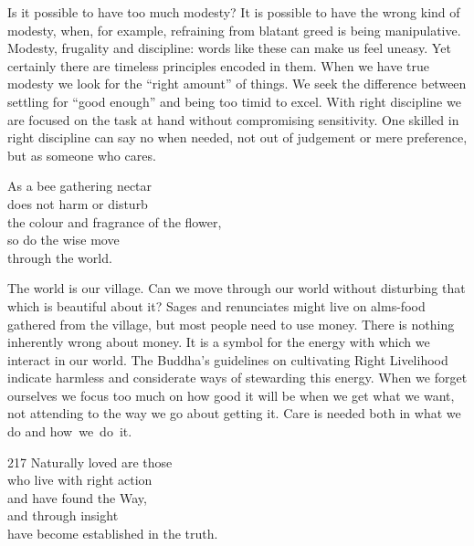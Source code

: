 \begin{dhpRefl}

Is it possible to have too much modesty? It is possible to have the
wrong kind of modesty, when, for example, refraining from blatant
greed is being manipulative. Modesty, frugality and discipline: words
like these can make us feel uneasy. Yet certainly there are timeless
principles encoded in them. When we have true modesty we look for the
``right amount'' of things. We seek the difference between settling for
``good enough'' and being too timid to excel. With right discipline we
are focused on the task at hand without compromising sensitivity.
One skilled in right discipline can say no when needed, not out of
judgement or mere preference, but as someone who cares.

\end{dhpRefl}


\begin{dhpVerse}{49}
\label{dhp-49}
As a bee gathering nectar\\
does not harm or disturb\\
the colour and fragrance of the flower,\\
so do the wise move\\
through the world.
\end{dhpVerse}

\begin{dhpRefl}

The world is our village. Can we move through our world without
disturbing that which is beautiful about it? Sages and renunciates
might live on alms-food gathered from the village, but most people
need to use money. There is nothing inherently wrong about money. It
is a symbol for the energy with which we interact in our world. The
Buddha's guidelines on cultivating Right Livelihood indicate harmless
and considerate ways of stewarding this energy. When we forget
ourselves we focus too much on how good it will be when we get what
we want, not attending to the way we go about getting it. Care is
needed both in what we do and how~we~do~it.

\end{dhpRefl}


\begin{dhpVerse}{217}
\label{dhp-217}
Naturally loved are those\\
who live with right action\\
and have found the Way,\\
and through insight\\
have become established in the truth.
\end{dhpVerse}

